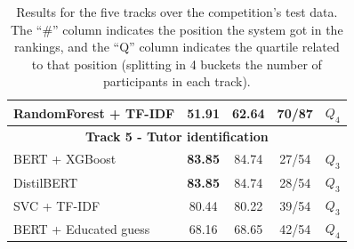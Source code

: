 \documentclass[11pt]{article}
\begin{document}
\begin{table}[ht!]
{\begin{tabular}{lcccc}
RandomForest + TF-IDF & 51.91 & 62.64 & 70/87 & $Q_4$ \\
\hline
\multicolumn{5}{c}{\textbf{Track 5 - Tutor identification}} \\
\hline
BERT + XGBoost & \textbf{83.85} & 84.74 & 27/54 & $Q_3$  \\
DistilBERT & \textbf{83.85} & 84.74 & 28/54 & $Q_3$   \\
SVC + TF-IDF & 80.44 & 80.22 & 39/54 & $Q_3$  \\
BERT + Educated guess & 68.16 & 68.65 & 42/54 &  $Q_4$ \\
\hline
\end{tabular}
}
\caption{Results for the five tracks over the competition's test data. The ``\#'' column indicates the position the system got in the rankings, and the ``Q'' column indicates the quartile related to that position (splitting in 4 buckets the number of participants in each track).}
\label{tab:submissions}
\end{table}



\begin{table}[t!]
\centering
{}
  \caption{\label{tab:team_performance_deltas} Performance difference between our best submissions and the winners, for each task. This table was built based on the \textit{team results}, so the total number of submissions for each track is always fewer than those considered in Table~\ref{tab:submissions}.}
\end{table}
\end{document}

